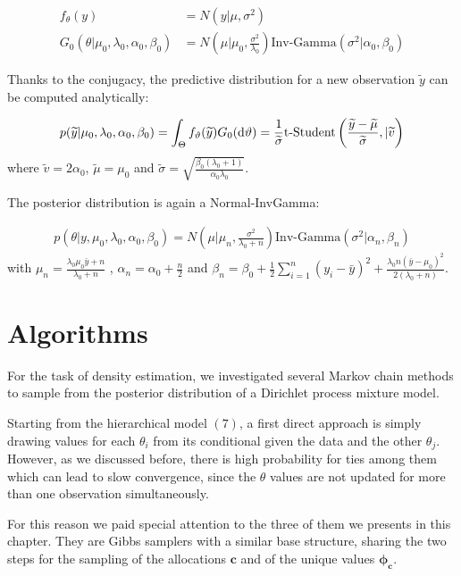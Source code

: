 \begin{align}
            	f_\theta(y)&=N(y| \mu ,\sigma^2)  \\
            	G_0(\theta|\mu_0,\lambda_0, \alpha_0, \beta_0)&=N\left(\mu | \mu_0 ,\frac{\sigma^2} {\lambda_0}\right)\text{Inv-Gamma}(\sigma^2|\alpha_0, \beta_0 )
\end{align}

Thanks to the conjugacy, the predictive distribution for a new observation $\widetilde{y}$ can be computed analytically:

\begin{align}
      p(\widetilde{y}|\mu_0,\lambda_0, \alpha_0, \beta_0)= \int_\Theta f_\vartheta(\widetilde{y})G_0(\mathrm d\vartheta)= \frac{1}{\widetilde{\sigma}} \text{t-Student}\left(\frac{\widetilde{y}-\widetilde{\mu}}{\widetilde{\sigma}} ,|\widetilde{v}\right)        	
\end{align}
where $\widetilde{v}=2 \alpha_0$, $\widetilde{\mu}=\mu_0$ and $\widetilde{\sigma}= \sqrt{\frac{\beta_0(\lambda_0+1)}{\alpha_0 \lambda_0}}$.

The posterior distribution is again a Normal-InvGamma:

\begin{align}
          p(\theta|y,\mu_0,\lambda_0, \alpha_0, \beta_0)=N\left(\mu | \mu_n ,\frac{\sigma^2} {\lambda_0 + n}\right)\text{Inv-Gamma}(\sigma^2|\alpha_n, \beta_n )
\end{align}
with $\mu_n=\frac{\lambda_0 \mu_0 \bar{y} + n}{\lambda_0 + n}$ , $\alpha_n= \alpha_0 + \frac{n}{2} $ and $\beta_n= \beta_0 + \frac{1}{2}\sum_{i=1}^{n} (y_i-\bar{y})^2 + \frac{\lambda_0 n(\bar{y}-\mu_0)^2}{2(\lambda_0 + n)}$.

\section{Algorithms}

For the task of density estimation, we investigated several Markov chain methods to sample from the posterior distribution of a Dirichlet process mixture model.

Starting from the hierarchical model $(7)$, a first direct approach is simply drawing values for each $\theta_i$ from its conditional given the data and the other $\theta_j$. However, as we discussed before, there is high probability for ties among them which can lead to slow convergence, since the $\theta$ values are not updated for more than one observation simultaneously.

For this reason we paid special attention to the three of them we presents in this chapter. They are Gibbs samplers with a similar base structure, sharing the two steps for the sampling of the allocations $\mathbf{c}$ and of the unique values $\mathbf{\phi_c}$. 

